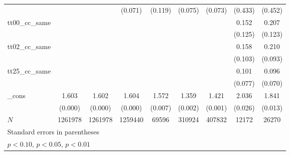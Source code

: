 {\begin{tabular}{l*{8}{c}}
            &                    &                    &     (0.071)        &     (0.119)        &     (0.075)        &     (0.073)        &     (0.433)        &     (0.452)        \\
[1em]
tt00\_cc\_same&                    &                    &                    &                    &                    &                    &       0.152        &       0.207\sym{+} \\
            &                    &                    &                    &                    &                    &                    &     (0.125)        &     (0.123)        \\
[1em]
tt02\_cc\_same&                    &                    &                    &                    &                    &                    &       0.158        &       0.210\sym{*} \\
            &                    &                    &                    &                    &                    &                    &     (0.103)        &     (0.093)        \\
[1em]
tt25\_cc\_same&                    &                    &                    &                    &                    &                    &       0.101        &       0.096        \\
            &                    &                    &                    &                    &                    &                    &     (0.077)        &     (0.070)        \\
[1em]
\_cons      &       1.603\sym{**}&       1.602\sym{**}&       1.604\sym{**}&       1.572\sym{**}&       1.359\sym{**}&       1.421\sym{**}&       2.036\sym{**}&       1.841\sym{**}\\
            &     (0.000)        &     (0.000)        &     (0.000)        &     (0.007)        &     (0.002)        &     (0.001)        &     (0.026)        &     (0.013)        \\
\hline
\(N\)       &     1261978        &     1261978        &     1259440        &       69596        &      310924        &      407832        &       12172        &       26270        \\
\hline\hline
\multicolumn{9}{l}{\footnotesize Standard errors in parentheses}\\
\multicolumn{9}{l}{\footnotesize \sym{+} \(p<0.10\), \sym{*} \(p<0.05\), \sym{**} \(p<0.01\)}\\
\end{tabular}
}
